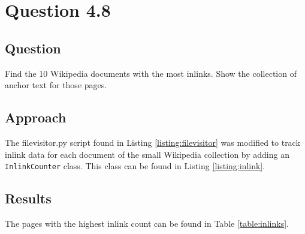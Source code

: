 \section{Question 4.8}

\subsection{Question}
Find the 10 Wikipedia documents with the most inlinks. Show the collection of anchor text for those pages.

\subsection{Approach}
The filevisitor.py script found in Listing \ref{listing:filevisitor} was modified to track inlink data for each document of the small Wikipedia collection by adding an \texttt{InlinkCounter} class.  This class can be found in Listing \ref{listing:inlink}.  



\subsection{Results}
The pages with the highest inlink count can be found in Table \ref{table:inlinks}.

